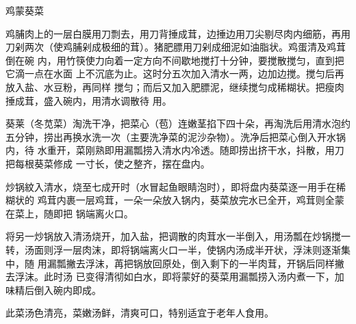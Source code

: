 \begin{recipe}{鸡蒙葵菜}

\ingredients


\preparation

\step 鸡脯肉上的一层白膜用刀剽去，用刀背捶成茸，边捶边用刀尖剔尽肉内细筋，再用
刀剁两次（使鸡脯剁成极细的茸）。猪肥膘用刀剁成细泥如油脂状。鸡蛋清及鸡茸倒在碗
内，用竹筷使力向着一定方向不间歇地搅打十分钟，要搅散搅匀，直到把它滴一点在水面
上不沉底为止。这时分五次加入清水一两，边加边搅。搅匀后再放入盐、水豆粉，再同样
搅匀；而后又加入肥膘泥，继续搅匀成稀糊状。把瘦肉捶成茸，盛入碗内，用清水调散待
用。

\step 葵莱（冬苋菜）淘洗干净，把菜心（苞）连嫩茎掐下四十朵，再淘洗后用清水泡约
五分钟，捞出再换水洗一次（主要洗净菜的泥沙杂物）。洗净后把菜心倒入开水锅内，待
水重开，菜刚熟即用漏瓢捞入清水内冷透。随即捞出挤干水，抖散，用刀把每根葵菜修成
一寸长，使之整齐，摆在盘内。

炒锅紋入清水，烧至七成开时（水冒起鱼眼睛泡时），即将盘内葵菜逐一用手在稀糊状的
鸡茸内裹一层鸡茸，一朵一朵放入锅内，葵菜放完水已全开，鸡茸则全蒙在菜上，随即把
锅端离火口。

\step 将另一炒锅放入清汤烧开，加入盐，把调散的肉茸水一半倒入，用汤瓢在炒锅搅一
转，汤面则浮一层肉沫，即将锅端离火口一半，使锅内汤成半开状，浮沬则逐渐集中，随
用漏瓢撇去浮沫，苒把锅放回原处，倒入剩下的一半肉茸，开锅后同样撇去浮沫。此时汤
已变得清彻如白水，即将蒙好的葵菜用漏瓢捞入汤内煮一下，加味精后倒入碗内即成。

\features

此菜汤色清亮，菜嫩汤鲜，清爽可口，特别适宜于老年人食用。

\end{recipe}

